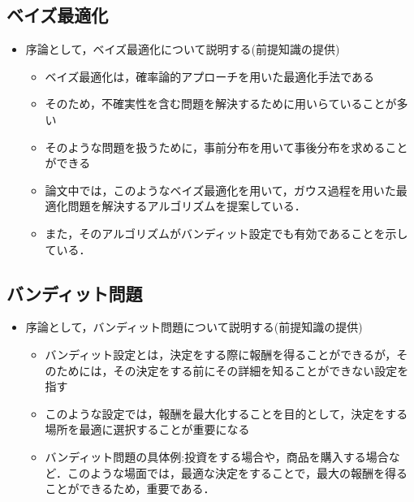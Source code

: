\documentclass[dvipdfmx, 10.5pt]{beamer}
\begin{document}
\subsection{ベイズ最適化}
\begin{frame}{\insertsubsection}
	\begin{itemize}
		\item 序論として，ベイズ最適化について説明する(前提知識の提供)
		\begin{itemize}
			\item ベイズ最適化は，確率論的アプローチを用いた最適化手法である
			\item そのため，不確実性を含む問題を解決するために用いらていることが多い
			\item そのような問題を扱うために，事前分布を用いて事後分布を求めることができる
			\item 論文中では，このようなベイズ最適化を用いて，ガウス過程を用いた最適化問題を解決するアルゴリズムを提案している．
			\item また，そのアルゴリズムがバンディット設定でも有効であることを示している．
		\end{itemize}
	\end{itemize}

\end{frame}


\subsection{バンディット問題}
\begin{frame}{\insertsubsection}
	\begin{itemize}
		\item 序論として，バンディット問題について説明する(前提知識の提供)
		\begin{itemize}
			\item バンディット設定とは，決定をする際に報酬を得ることができるが，そのためには，その決定をする前にその詳細を知ることができない設定を指す
			\item このような設定では，報酬を最大化することを目的として，決定をする場所を最適に選択することが重要になる
			\item バンディット問題の具体例:投資をする場合や，商品を購入する場合など．このような場面では，最適な決定をすることで，最大の報酬を得ることができるため，重要である．
		\end{itemize}
	\end{itemize}
\end{frame}
\end{document}
